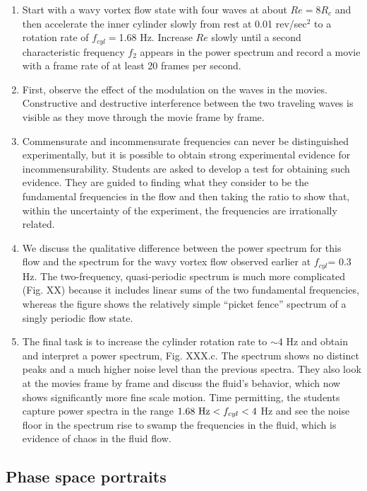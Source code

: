 \documentclass[%
 amsmath,amssymb,
 aps,
floatfix,
aps,prd,longbibliography,
notitlepage
]{revtex4-1}
\begin{document}
\begin{enumerate}
\begin{enumerate}
\item  Start with a wavy vortex flow state with four waves at about $Re=8R_c$ and then accelerate the inner cylinder slowly from rest at 0.01 rev/sec$^2$ to a rotation rate of $f_{cyl}=$1.68 Hz. Increase $Re$ slowly  until a second characteristic frequency $f_2$ appears in the power spectrum and record a movie with a frame rate of at least 20 frames per second.
\item  First, observe the effect of the modulation on the waves in the movies. Constructive and destructive interference between the two traveling waves is visible as they move through the movie frame by frame.
\item  Commensurate and incommensurate frequencies can never be distinguished experimentally, but it is possible to obtain strong experimental evidence for incommensurability.  Students are asked to develop a test for obtaining such evidence. They are guided to finding what they consider to be the fundamental frequencies in the flow and then taking the ratio to show that, within the uncertainty of the experiment, the frequencies are irrationally related.
\item We discuss the qualitative difference between the power spectrum for this flow and the spectrum for the wavy vortex flow observed earlier at $f_{cyl}$= 0.3 Hz. The two-frequency, quasi-periodic spectrum is much more complicated (Fig. XX) because it includes linear sums of the two fundamental frequencies, whereas the figure shows the relatively simple ``picket fence'' spectrum of a singly periodic flow state.
\item The final task is to increase the cylinder rotation rate to $\sim$4 Hz and obtain and interpret a power spectrum, Fig. XXX.c.  The spectrum shows no distinct peaks and a much higher noise level than the previous spectra. They also look at the movies frame by frame and discuss the fluid's behavior, which now shows significantly more fine scale motion. Time permitting, the students  capture power spectra in the range $1.68 {\rm ~Hz} <f_{cyl}<4$ Hz and see the noise floor in the spectrum rise to swamp the frequencies in the fluid, which is evidence of chaos in the fluid flow.
\end{enumerate}

\end{enumerate}


\subsection{Phase space portraits}
\end{document}
